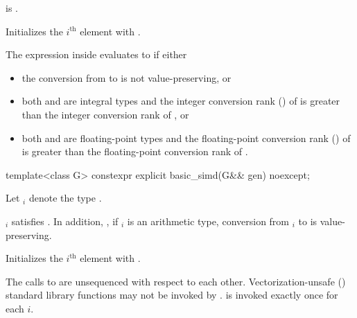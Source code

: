 \begin{itemdescr}
  \pnum\constraints
   is .

  \pnum\effects
  Initializes the $i^\text{th}$ element with  \foralli.

  \pnum\remarks
  The expression inside  evaluates to  if either
  \begin{itemize}
    \item the conversion from  to  is not
      value-preserving, or

    \item both  and  are integral types and the
      integer conversion rank () of  is greater than
      the integer conversion rank of , or

    \item both  and  are floating-point types and
      the floating-point conversion rank () of  is
      greater than the floating-point conversion rank of .
  \end{itemize}
\end{itemdescr}

\begin{itemdecl}
template<class G> constexpr explicit basic_simd(G&& gen) noexcept;
\end{itemdecl}

\begin{itemdescr}
  \pnum Let $_i$ denote the type
  .

  \pnum\constraints
  $_i$ satisfies  \foralli.
  In addition, \foralli, if $_i$ is an arithmetic type, conversion from
  $_i$ to  is value-preserving.

  \pnum\effects
  Initializes the $i^\text{th}$ element with
   \foralli.

  \pnum\remarks
    The calls to  are unsequenced with respect to each other.
    Vectorization-unsafe () standard library
    functions may not be invoked by .
     is invoked exactly once for each $i$.

   
\end{itemdescr}


